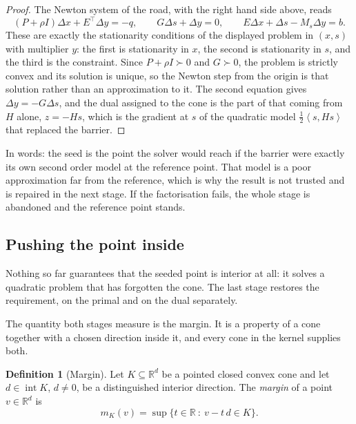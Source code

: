 \documentclass[a4paper,11pt]{book}
\theoremstyle{plain}
\theoremstyle{definition}
\newtheorem{definition}[theorem]{Definition}
\theoremstyle{remark}
\numberwithin{equation}{chapter}
\numberwithin{algorithm}{chapter}
\newcommand{\R}{\mathbb{R}}
\newcommand{\inner}[2]{\left\langle #1, #2 \right\rangle}
\newcommand{\intr}{\operatorname{int}}
\begin{document}
	\begin{proof}
		The Newton system of the road, with the right hand side above, reads
		\[
		(P+\rho I)\Delta x+E^{\top}\Delta y=-q,
		\qquad
		G\Delta s+\Delta y=0,
		\qquad
		E\Delta x+\Delta s-M_s\Delta y=b .
		\]
		These are exactly the stationarity conditions of the displayed problem in
		$(x,s)$ with multiplier $y$: the first is stationarity in $x$, the second
		is stationarity in $s$, and the third is the constraint. Since $P+\rho
		I\succ0$ and $G\succ0$, the problem is strictly convex and its solution is
		unique, so the Newton step from the origin is that solution rather than an
		approximation to it. The second equation gives $\Delta y=-G\Delta s$, and
		the dual assigned to the cone is the part of that coming from $H$ alone,
		$z=-Hs$, which is the gradient at $s$ of the quadratic model $\tfrac12
		\inner{s}{Hs}$ that replaced the barrier.
	\end{proof}

	In words: the seed is the point the solver would reach if the barrier were
	exactly its own second order model at the reference point. That model is a
	poor approximation far from the reference, which is why the result is not
	trusted and is repaired in the next stage. If the factorisation fails, the
	whole stage is abandoned and the reference point stands.

	\subsection{Pushing the point inside}

	Nothing so far guarantees that the seeded point is interior at all: it solves
	a quadratic problem that has forgotten the cone. The last stage restores the
	requirement, on the primal and on the dual separately.

	The quantity both stages measure is the margin. It is a property of a cone together
	with a chosen direction inside it, and every cone in the kernel supplies both.

	\begin{definition}[Margin]\label{def:margin}
		Let $K\subseteq\R^d$ be a pointed closed convex cone and let
		$d\in\intr K$, $d\neq0$, be a distinguished interior direction. The
		\emph{margin} of a point $v\in\R^d$ is
		\begin{equation}
			m_K(v)=\sup\bigl\{t\in\R\ :\ v-t\,d\in K\bigr\} .
		\end{equation}
	\end{definition}
\end{document}
